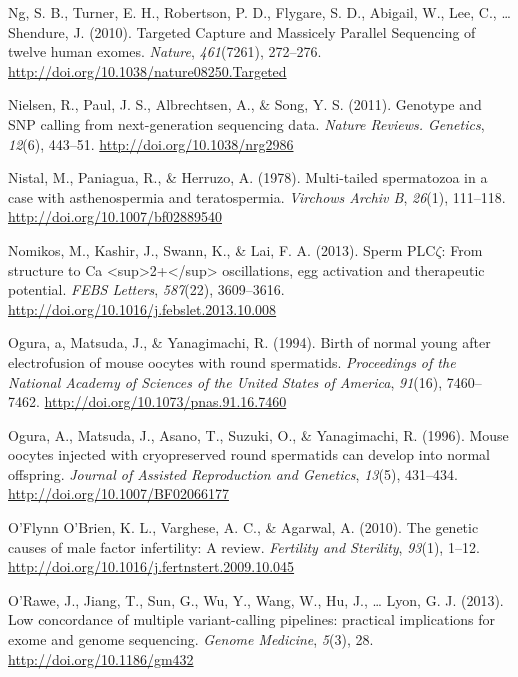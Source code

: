 \documentclass[12pt,twoside]{reedthesis}
\theoremstyle{definition}
\theoremstyle{definition}
\theoremstyle{remark}
\begin{document}
  \hypertarget{ref-Ng2010}{}
  Ng, S. B., Turner, E. H., Robertson, P. D., Flygare, S. D., Abigail, W.,
  Lee, C., \ldots{} Shendure, J. (2010). Targeted Capture and Massicely
  Parallel Sequencing of twelve human exomes. \emph{Nature},
  \emph{461}(7261), 272--276.
  \url{http://doi.org/10.1038/nature08250.Targeted}
  
  \hypertarget{ref-Nielsen2011}{}
  Nielsen, R., Paul, J. S., Albrechtsen, A., \& Song, Y. S. (2011).
  Genotype and SNP calling from next-generation sequencing data.
  \emph{Nature Reviews. Genetics}, \emph{12}(6), 443--51.
  \url{http://doi.org/10.1038/nrg2986}
  
  \hypertarget{ref-Nistal}{}
  Nistal, M., Paniagua, R., \& Herruzo, A. (1978). Multi-tailed
  spermatozoa in a case with asthenospermia and teratospermia.
  \emph{Virchows Archiv B}, \emph{26}(1), 111--118.
  \url{http://doi.org/10.1007/bf02889540}
  
  \hypertarget{ref-Nomikos2013}{}
  Nomikos, M., Kashir, J., Swann, K., \& Lai, F. A. (2013). Sperm
  PLC\(\zeta\): From structure to Ca
  \textless{}sup\textgreater{}2+\textless{}/sup\textgreater{}
  oscillations, egg activation and therapeutic potential. \emph{FEBS
  Letters}, \emph{587}(22), 3609--3616.
  \url{http://doi.org/10.1016/j.febslet.2013.10.008}
  
  \hypertarget{ref-Ogura1994}{}
  Ogura, a, Matsuda, J., \& Yanagimachi, R. (1994). Birth of normal young
  after electrofusion of mouse oocytes with round spermatids.
  \emph{Proceedings of the National Academy of Sciences of the United
  States of America}, \emph{91}(16), 7460--7462.
  \url{http://doi.org/10.1073/pnas.91.16.7460}
  
  \hypertarget{ref-Kimura1995}{}
  Ogura, A., Matsuda, J., Asano, T., Suzuki, O., \& Yanagimachi, R.
  (1996). Mouse oocytes injected with cryopreserved round spermatids can
  develop into normal offspring. \emph{Journal of Assisted Reproduction
  and Genetics}, \emph{13}(5), 431--434.
  \url{http://doi.org/10.1007/BF02066177}
  
  \hypertarget{ref-OFlynnOBrien2010}{}
  O'Flynn O'Brien, K. L., Varghese, A. C., \& Agarwal, A. (2010). The
  genetic causes of male factor infertility: A review. \emph{Fertility and
  Sterility}, \emph{93}(1), 1--12.
  \url{http://doi.org/10.1016/j.fertnstert.2009.10.045}
  
  \hypertarget{ref-ORawe2013}{}
  O'Rawe, J., Jiang, T., Sun, G., Wu, Y., Wang, W., Hu, J., \ldots{} Lyon,
  G. J. (2013). Low concordance of multiple variant-calling pipelines:
  practical implications for exome and genome sequencing. \emph{Genome
  Medicine}, \emph{5}(3), 28. \url{http://doi.org/10.1186/gm432}
  
\end{document}
